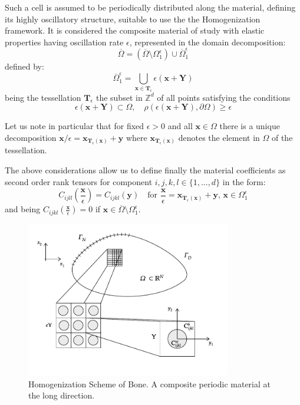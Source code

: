 Such a cell is assumed to be periodically distributed along the material, defining its highly oscillatory structure, suitable to use the the Homogenization framework. It is considered the composite material of study with elastic properties having oscillation rate $\epsilon$, represented in the domain decomposition:
\begin{equation*}
	\overline{\Omega} = (\overline{\Omega}\setminus \Omega_1^{\epsilon}) \cup \overline{\Omega}^{\epsilon}_1
\end{equation*}
defined by:
\begin{equation*}
    \overline{\Omega}^{\epsilon}_1 = \bigcup_{\mathbf{x} \in \mathbf{T}_{\epsilon}} \epsilon ( \mathbf{x} + \mathbf{Y} )
\end{equation*}
being the tessellation $\mathbf{T}_{\epsilon}$ the subset in $\mathbb{Z}^d$ of all points satisfying the conditions
\begin{equation*}
    \epsilon (\mathbf{x} + \mathbf{Y}) \subset \Omega, \quad \rho(\epsilon(\mathbf{x}+\mathbf{Y}), \partial \Omega) \geq \epsilon
\end{equation*}

Let us note in particular that for fixed $\epsilon >0$ and all $\mathbf{x} \in \Omega$ there is a unique decomposition $\mathbf{x}/\epsilon = \mathbf{x}_{\mathbf{T}_{\epsilon}(\mathbf{x})} + \mathbf{y}$ where $\mathbf{x}_{\mathbf{T}_{\epsilon}(\mathbf{x})}$ denotes the element in $\Omega$ of the tessellation.

The above considerations allow us to define finally the material coefficients as second order rank tensors for component $i,j,k,l \in \{1,\dots, d\}$ in the form:
\begin{equation*}
    C_{ijll}(\frac{\mathbf{x}}{\epsilon}) = C_{ijkl}(\mathbf{y}) \quad \text{for } \frac{\mathbf{x}}{\epsilon} = \mathbf{x}_{\mathbf{T}_{\epsilon}(\mathbf{x})} + \mathbf{y}, \, \mathbf{x} \in \Omega_1^{\epsilon}
\end{equation*}
and being $C_{ijkl}(\frac{\mathbf{x}}{\epsilon}) = 0$ if $\mathbf{x} \in \overline{\Omega} \setminus \Omega_1^{\epsilon}$.

\begin{figure}[!h]
	\centering
	\includegraphics[width=0.8\textwidth]{images/HomSchemes/HomBasicScheme.pdf}
	\caption{Homogenization Scheme of Bone. A composite periodic material at the long direction.}
	\label{HomBasicScheme}
\end{figure}

